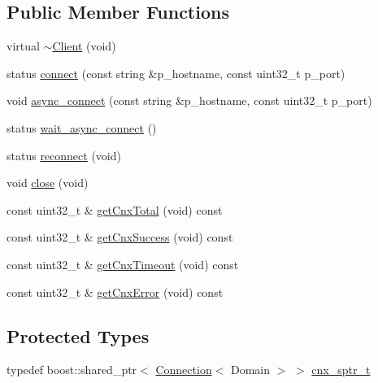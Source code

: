 \subsection*{Public Member Functions}
\begin{DoxyCompactItemize}
\item 
virtual \hyperlink{classxtd_1_1network_1_1base_1_1Client_a890cd6837ad0ccd2bf928f171e7696d0}{$\sim$\+Client} (void)
\item 
status \hyperlink{classxtd_1_1network_1_1base_1_1Client_abf9740f4b9eed341858ad27018cc4469}{connect} (const string \&p\+\_\+hostname, const uint32\+\_\+t p\+\_\+port)
\item 
void \hyperlink{classxtd_1_1network_1_1base_1_1Client_ac7427711e506f5958f80a89028f3f923}{async\+\_\+connect} (const string \&p\+\_\+hostname, const uint32\+\_\+t p\+\_\+port)
\item 
status \hyperlink{classxtd_1_1network_1_1base_1_1Client_ada6c4a1254620f7f5d83d3c890748300}{wait\+\_\+async\+\_\+connect} ()
\item 
status \hyperlink{classxtd_1_1network_1_1base_1_1Client_a268f40287ee277801cad202fa1380970}{reconnect} (void)
\item 
void \hyperlink{classxtd_1_1network_1_1base_1_1Client_a520d6aebfcf0e0892515bc0fec3a37c7}{close} (void)
\item 
const uint32\+\_\+t \& \hyperlink{classxtd_1_1network_1_1base_1_1Client_abff34ffec3663d843d97f42a7ce73d2f}{get\+Cnx\+Total} (void) const 
\item 
const uint32\+\_\+t \& \hyperlink{classxtd_1_1network_1_1base_1_1Client_a1d72f9e19322a7c2d533422c4f9e9777}{get\+Cnx\+Success} (void) const 
\item 
const uint32\+\_\+t \& \hyperlink{classxtd_1_1network_1_1base_1_1Client_aa585da9396b4067ac2535cdc4c1acbbb}{get\+Cnx\+Timeout} (void) const 
\item 
const uint32\+\_\+t \& \hyperlink{classxtd_1_1network_1_1base_1_1Client_a3023500754c12ccfdd200706d9995fd7}{get\+Cnx\+Error} (void) const 
\end{DoxyCompactItemize}
\subsection*{Protected Types}
\begin{DoxyCompactItemize}
\item 
typedef boost\+::shared\+\_\+ptr$<$ \hyperlink{classxtd_1_1network_1_1base_1_1Connection}{Connection}$<$ Domain $>$ $>$ \hyperlink{classxtd_1_1network_1_1base_1_1Client_a3cef8310676dac754d630bcc1628ab56}{cnx\+\_\+sptr\+\_\+t}
\end{DoxyCompactItemize}
